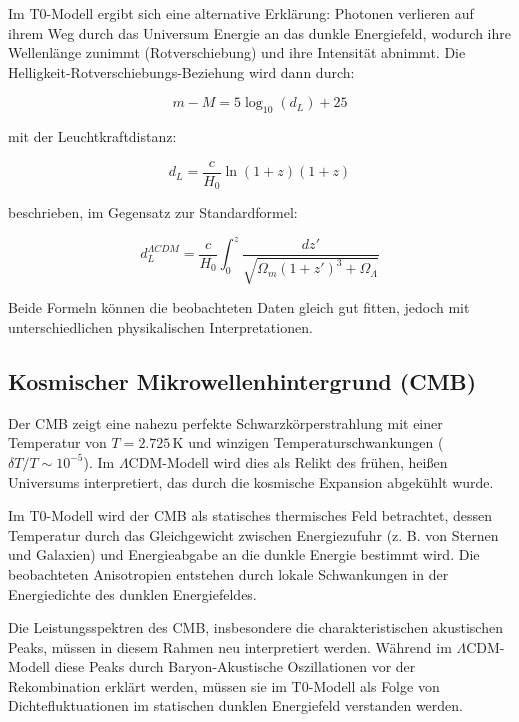 \documentclass[a4paper,12pt]{article}
\theoremstyle{definition}
\theoremstyle{remark}
\begin{document}
	Im T0-Modell ergibt sich eine alternative Erklärung: Photonen verlieren auf ihrem Weg durch das Universum Energie an das dunkle Energiefeld, wodurch ihre Wellenlänge zunimmt (Rotverschiebung) und ihre Intensität abnimmt. Die Helligkeit-Rotverschiebungs-Beziehung wird dann durch:
	
	\begin{equation}
		m - M = 5 \log_{10}(d_L) + 25
	\end{equation}
	
	mit der Leuchtkraftdistanz:
	
	\begin{equation}
		d_L = \frac{c}{H_0} \ln(1+z) (1+z)
	\end{equation}
	
	beschrieben, im Gegensatz zur Standardformel:
	
	\begin{equation}
		d_L^{\Lambda CDM} = \frac{c}{H_0} \int_0^z \frac{dz'}{\sqrt{\Omega_m(1+z')^3 + \Omega_\Lambda}}
	\end{equation}
	
	Beide Formeln können die beobachteten Daten gleich gut fitten, jedoch mit unterschiedlichen physikalischen Interpretationen.
	
	\subsection{Kosmischer Mikrowellenhintergrund (CMB)}
	Der CMB zeigt eine nahezu perfekte Schwarzkörperstrahlung mit einer Temperatur von $T = 2.725 \, \text{K}$ und winzigen Temperaturschwankungen ($\delta T/T \sim 10^{-5}$). Im $\Lambda$CDM-Modell wird dies als Relikt des frühen, heißen Universums interpretiert, das durch die kosmische Expansion abgekühlt wurde.
	
	Im T0-Modell wird der CMB als statisches thermisches Feld betrachtet, dessen Temperatur durch das Gleichgewicht zwischen Energiezufuhr (z. B. von Sternen und Galaxien) und Energieabgabe an die dunkle Energie bestimmt wird. Die beobachteten Anisotropien entstehen durch lokale Schwankungen in der Energiedichte des dunklen Energiefeldes.
	
	Die Leistungsspektren des CMB, insbesondere die charakteristischen akustischen Peaks, müssen in diesem Rahmen neu interpretiert werden. Während im $\Lambda$CDM-Modell diese Peaks durch Baryon-Akustische Oszillationen vor der Rekombination erklärt werden, müssen sie im T0-Modell als Folge von Dichtefluktuationen im statischen dunklen Energiefeld verstanden werden.
	
\end{document}
